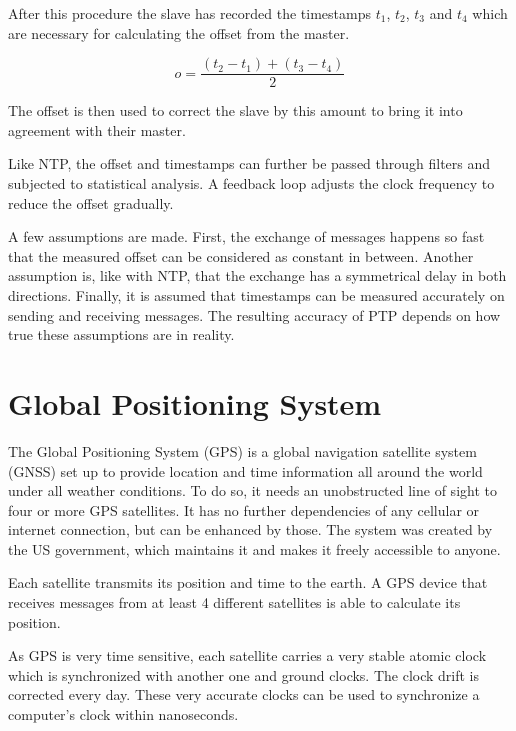 After this procedure the slave has recorded the timestamps $t_1$, $t_2$, $t_3$ and $t_4$ which are necessary for calculating the offset from the master.

\[ o = \frac{(t_2 - t_1) + (t_3 - t_4)}{2} \]

The offset is then used to correct the slave by this amount to bring it into agreement with their master.

Like NTP, the offset and timestamps can further be passed through filters and subjected to statistical analysis. A feedback loop adjusts the clock frequency to reduce the offset gradually.

A few assumptions are made. First, the exchange of messages happens so fast that the measured offset can be considered as constant in between. Another assumption is, like with NTP, that the exchange has a symmetrical delay in both directions. Finally, it is assumed that timestamps can be measured accurately on sending and receiving messages. The resulting accuracy of PTP depends on how true these assumptions are in reality.

\section{Global Positioning System}

The Global Positioning System (GPS) is a global navigation satellite system (GNSS) set up to provide location and time information all around the world under all weather conditions.\cite{gps_sps,gps_waas} To do so, it needs an unobstructed line of sight to four or more GPS satellites. It has no further dependencies of any cellular or internet connection, but can be enhanced by those. The system was created by the US government, which maintains it and makes it freely accessible to anyone.

Each satellite transmits its position and time to the earth. A GPS device that receives messages from at least 4 different satellites is able to calculate its position.

As GPS is very time sensitive, each satellite carries a very stable atomic clock which is synchronized with another one and ground clocks. The clock drift is corrected every day.
These very accurate clocks can be used to synchronize a computer's clock within nanoseconds.

